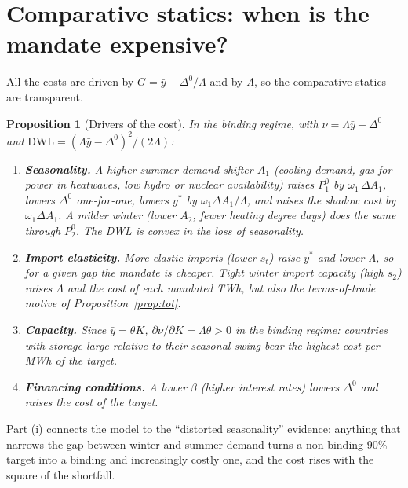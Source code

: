 \documentclass[11pt]{article}
\newtheorem{proposition}{Proposition}
\theoremstyle{definition}
\newcommand{\ybar}{\bar y}
\newcommand{\Dz}{\Delta^{0}}
\begin{document}
\section{Comparative statics: when is the mandate expensive?}\label{sec:cs}

All the costs are driven by $G=\ybar-\Dz/\Lambda$ and by $\Lambda$, so the comparative statics are transparent.

\begin{proposition}[Drivers of the cost]\label{prop:cs}
In the binding regime, with $\nu=\Lambda\ybar-\Dz$ and $\text{DWL}=(\Lambda\ybar-\Dz)^2/(2\Lambda)$:
\begin{enumerate}[label=(\roman*)]
\item \textbf{Seasonality.} A higher summer demand shifter $A_1$ (cooling demand, gas-for-power in heatwaves,
low hydro or nuclear availability) raises $P_1^0$ by $\omega_1\,\Delta A_1$, lowers $\Dz$ one-for-one, lowers $y^*$ by
$\omega_1\Delta A_1/\Lambda$, and raises the shadow cost by $\omega_1\Delta A_1$. A milder winter (lower $A_2$, fewer heating
degree days) does the same through $P_2^0$. The DWL is convex in the loss of seasonality.
\item \textbf{Import elasticity.} More elastic imports (lower $s_t$) raise $y^*$ and lower $\Lambda$, so for a given gap
the mandate is cheaper. Tight winter import capacity (high $s_2$) raises $\Lambda$ and the cost of each mandated TWh,
but also the terms-of-trade motive of Proposition~\ref{prop:tot}.
\item \textbf{Capacity.} Since $\ybar=\theta K$, $\partial\nu/\partial K=\Lambda\theta>0$ in the binding regime: countries with
storage large relative to their seasonal swing bear the highest cost per MWh of the target.
\item \textbf{Financing conditions.} A lower $\beta$ (higher interest rates) lowers $\Dz$ and raises the cost of the target.
\end{enumerate}
\end{proposition}

Part (i) connects the model to the ``distorted seasonality'' evidence: anything that narrows the gap between
winter and summer demand turns a non-binding 90\% target into a binding and increasingly costly one, and the
cost rises with the square of the shortfall.
\end{document}
